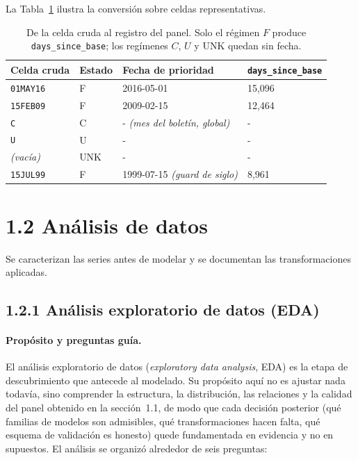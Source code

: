 \documentclass[12pt,letterpaper]{report}
\begin{document}
La Tabla~\ref{tab:cleansing} ilustra la conversión sobre celdas representativas.

\begin{table}[H]
\centering
\footnotesize
\caption[Conversión de celdas representativas]{De la celda cruda al registro del panel. Solo el
régimen $F$ produce \texttt{days\_since\_base}; los regímenes $C$, $U$ y UNK quedan sin fecha.}
\label{tab:cleansing}
\begin{tabular}{llll}
\toprule
\rowcolor{uacjblue!15}
\textbf{Celda cruda} & \textbf{Estado} & \textbf{Fecha de prioridad} & \textbf{\texttt{days\_since\_base}} \\ \midrule
\texttt{01MAY16}          & F   & 2016-05-01                          & 15{,}096 \\
\texttt{15FEB09}          & F   & 2009-02-15                          & 12{,}464 \\
\texttt{C}                & C   & - \textit{(mes del boletín, global)} & - \\
\texttt{U}                & U   & -                                 & - \\
\textit{(vacía)}          & UNK & -                                 & - \\
\texttt{15JUL99}          & F   & 1999-07-15 \textit{(guard de siglo)} & 8{,}961 \\
\bottomrule
\end{tabular}
\end{table}

\section{1.2 Análisis de datos}

Se caracterizan las series antes de modelar y se documentan las transformaciones
aplicadas.

\subsection{1.2.1 Análisis exploratorio de datos (EDA)}

\paragraph{Propósito y preguntas guía.} El análisis exploratorio de datos
(\textit{exploratory data analysis}, EDA) es la etapa de descubrimiento que antecede al
modelado. Su propósito aquí no es ajustar nada todavía, sino comprender la estructura, la
distribución, las relaciones y la calidad del panel obtenido en la sección~1.1, de modo que
cada decisión posterior (qué familias de modelos son admisibles, qué transformaciones hacen
falta, qué esquema de validación es honesto) quede fundamentada en evidencia y no en
supuestos. El análisis se organizó alrededor de seis preguntas:
\end{document}
